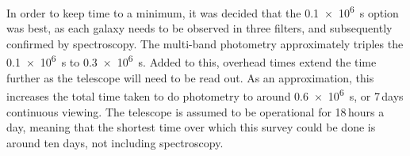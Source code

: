 	In order to keep time to a minimum, it was decided that the \SI{0.1e6}{\second} option was best, as each galaxy needs to be observed in three filters, and subsequently confirmed by spectroscopy. The multi-band photometry approximately triples the \SI{0.1e6}{\second} to \SI{0.3e6}{\second}. Added to this, overhead times extend the time further as the telescope will need to be read out. As an approximation, this increases the total time taken to do photometry to around \SI{0.6e6}{\second}, or 7\,days continuous viewing. The telescope is assumed to be operational for 18\,hours a day, meaning that the shortest time over which this survey could be done is around ten days, not including spectroscopy.
